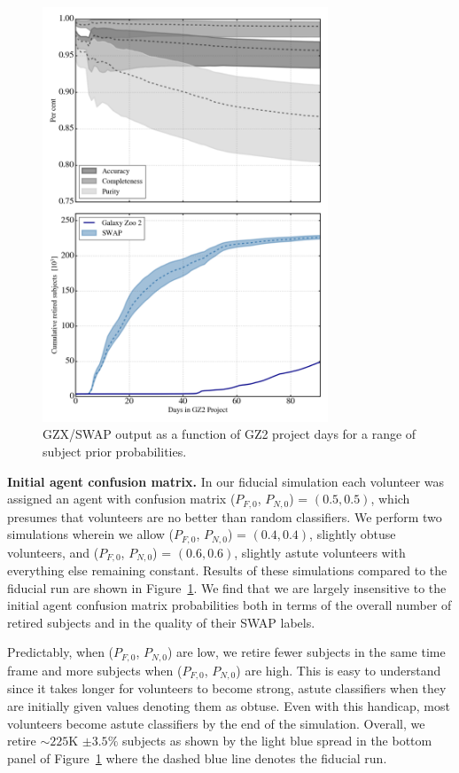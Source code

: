 \documentclass[twocolumn]{aastex6}
\newcommand{\Pf}{$P_{F,0}$}
\newcommand{\Pn}{$P_{N,0}$}
\begin{document}
\begin{figure}[t]
\includegraphics[width=3.35in]{figures/GZX_eval_and_retirement_prior_spread_4paper_v2.png}
\caption{GZX/SWAP output as a function of GZ2 project days for a range of subject prior probabilities.  \label{fig: tweak swap}}
\end{figure}

\textbf{Initial agent confusion matrix.} 
In our fiducial simulation each volunteer was assigned an agent with confusion matrix
 (\Pf, \Pn) = $(0.5, 0.5)$, which presumes that volunteers are no better than 
random classifiers.  We perform two simulations wherein we allow (\Pf, \Pn) = $(0.4, 0.4)$, 
slightly obtuse volunteers, and (\Pf, \Pn) = $(0.6, 0.6)$, slightly astute volunteers 
with everything else remaining constant.  
Results of these simulations compared to the fiducial run are shown in 
Figure~\ref{fig: tweak swap}. We find that we are largely insensitive to the 
initial agent confusion matrix probabilities both in terms of the overall number of retired subjects
and in the quality of their SWAP labels. 

Predictably, when (\Pf, \Pn) are low, we retire fewer subjects in the same time frame and 
more subjects when (\Pf, \Pn) are high. This is easy to understand since it takes 
longer for volunteers to become strong, astute classifiers when they are initially 
given values denoting them as obtuse. Even with this handicap, most volunteers 
become astute classifiers by the end of the simulation. Overall,  we retire 
$\sim225$K  $\pm 3.5\%$ subjects as shown by the light blue spread in the bottom
panel of Figure~\ref{fig: tweak swap} where the dashed blue line
denotes the fiducial run. 
\end{document}

